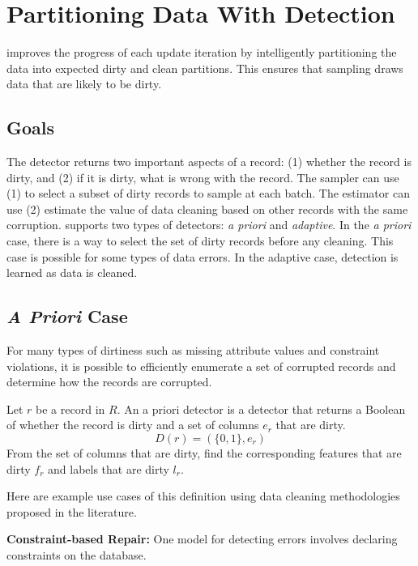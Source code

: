 \section{Partitioning Data With Detection}\label{det}
\sys improves the progress of each update iteration by intelligently partitioning the data into expected dirty and clean partitions. 
This ensures that sampling draws data that are likely to be dirty.

\subsection{Goals}
The detector returns two important aspects of a record: (1) whether the record is dirty, and (2) if it is dirty, what is wrong with the record.
The sampler can use (1) to select a subset of dirty records to sample at each batch. 
The estimator can use (2) estimate the value of data cleaning based on other records with the same corruption.
\sys supports two types of detectors: \emph{a priori} and \emph{adaptive}.
In the \emph{a priori} case, there is a way to select the set of dirty records before any cleaning.
This case is possible for some types of data errors.
In the adaptive case, detection is learned as data is cleaned.

\subsection{\protect\textit{\large A Priori} Case}
For many types of dirtiness such as missing attribute values and constraint violations, it is possible to efficiently enumerate a set of corrupted records and determine how the records are corrupted.

\begin{definition}
Let $r$ be a record in $R$. An a priori detector is a detector that returns a Boolean of whether the record is dirty and a set of columns $e_r$ that are dirty.
\[
D(r) = (\{0,1\}, e_r)
\]
From the set of columns that are dirty, find the corresponding features that are dirty $f_r$ and labels that are dirty $l_r$.
\end{definition}

\noindent Here are example use cases of this definition using data cleaning methodologies proposed in the literature.

\vspace{0.5em}

\noindent\textbf{Constraint-based Repair: }
One model for detecting errors involves declaring constraints on the database.

